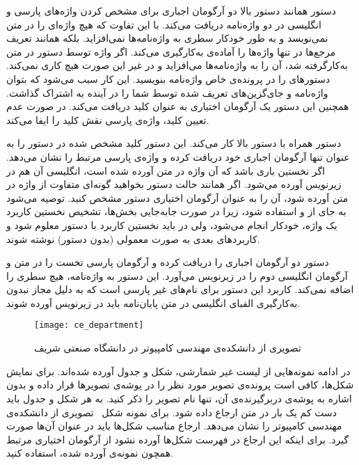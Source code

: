 	 دستور  همانند دستور بالا دو آرگومان اجباری برای مشخص کردن واژه‌های پارسی و انگلیسی در دو واژه‌نامه دریافت می‌کند. با این تفاوت که هیچ واژه‌ای را در متن نمی‌نویسد و به طور خودکار سطری به واژه‌نامه‌ها نمی‌افزاید. بلکه همانند تعریف مرجع‌ها در تنها واژه‌ها را آماده‌ی به‌کارگیری می‌کند. اگر واژه توسط دستور  در متن به‌کارگرفته شد، آن را به واژه‌نامه‌ها می‌افزاید و در غیر این صورت هیچ کاری نمی‌کند. دستورهای  را در پرونده‌ی خاص واژه‌نامه بنویسید. این کار سبب می‌شود که بتوان واژه‌نامه و جای‌گزین‌های تعریف شده توسط شما را در آینده به اشتراک گذاشت. همچنین این دستور یک آرگومان اختیاری به عنوان کلید دریافت می‌کند. در صورت عدم تعیین کلید، واژه‌ی پارسی نقش کلید را ایفا می‌کند.
	
	 دستور  همراه با دستور بالا کار می‌کند. این دستور کلید مشخص شده در دستور  را به عنوان تنها آرگومان اجباری خود دریافت کرده و واژه‌ی پارسی مرتبط را نشان می‌دهد. اگر نخستین باری باشد که آن واژه در متن آورده شده است، انگلیسی آن هم در زیرنویس آورده می‌شود. اگر همانند حالت دستور  بخواهید گونه‌ای متفاوت از واژه در متن آورده شود، آن را به عنوان آرگومان اختیاری دستور  مشخص کنید. توصیه می‌شود به جای  از  و  استفاده شود، زیرا در صورت جابه‌جایی بخش‌ها، تشخیص نخستین کاربرد یک واژه، خودکار انجام می‌شود، ولی در  باید نخستین کاربرد با دستور  معلوم شود و کاربردهای بعدی به صورت معمولی (بدون دستور) نوشته شوند.
	
	 دستور  دو آرگومان اجباری را دریافت کرده و آرگومان پارسی تخست را در متن و آرگومان انگلیسی دوم را در زیرنویس  می‌آورد. این دستور به واژه‌نامه، هیچ سطری را اضافه نمی‌کند. کاربرد این دستور برای نام‌های غیر پارسی است که به دلیل مجاز نبدون به‌کارگیری الفبای انگلیسی در متن پایان‌نامه باید در زیرنویس آورده شوند.


\begin{figure}[tbp]
\centering
\texttt{[image: ce\_department]}
\def\mytempcaption{تصویری از دانشکده‌ی مهندسی کامپیوتر در دانشگاه صنعتی شریف}
\caption[\mytempcaption]{\mytempcaption~\cite{sharif:cesite}}
\label{fig:cedepartment}
\end{figure}

در ادامه نمونه‌هایی از لیست غیر شمارشی، شکل و جدول آورده شده‌اند. برای نمایش شکل‌ها، کافی است پرونده‌ی تصویر مورد نظر را در پوشه‌ی تصویرها قرار داده و بدون اشاره به پوشه‌ی دربرگیرنده‌ی آن، تنها نام تصویر را ذکر کنید. به هر شکل و جدول باید دست کم یک بار در متن ارجاع داده شود. برای نمونه شکل~ تصویری از دانشکده‌ی مهندسی کامپیوتر را نشان می‌دهد. ارجاع مناسب شکل‌ها باید در عنوان آن‌ها صورت گیرد. برای اینکه این ارجاع در فهرست شکل‌ها آورده نشود از آرگومان اختیاری مرتبط همچون نمونه‌ی آورده شده، استفاده کنید.


